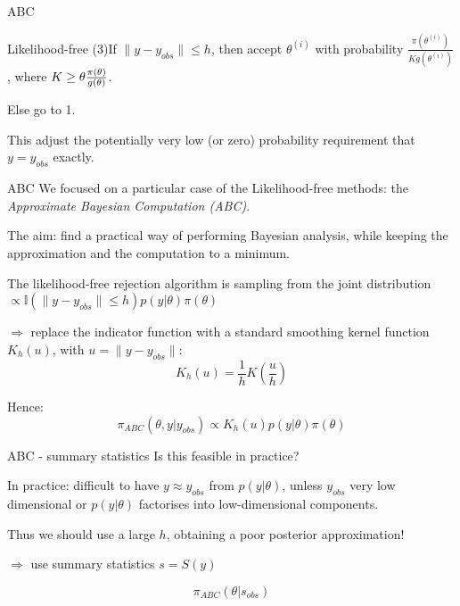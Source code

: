 \documentclass{beamer}
\theoremstyle{plain}
\begin{document}
\begin{section}{ABC}
\begin{frame}{Likelihood-free}
	\vspace{0.3cm}
	(3)If $\parallel y-y_{obs}\parallel \leq h$, then accept $\theta ^ {(i)}$ with probability $\frac{\pi(\theta ^ {(i)})}{K g(\theta ^ {(i)})}$, where $K \geq \maxof{\theta}{\frac{\pi(\theta)}{g(\theta)}}$. 
	
	Else go to 1.
	
	\vspace{0.5cm}
	
	This adjust the potentially very low (or zero) probability requirement that $y = y_{obs}$ exactly.
\end{frame}

\begin{frame}{ABC}
	We focused on a particular case of the Likelihood-free methods: the \emph{Approximate Bayesian Computation (ABC)}.
	
	\vspace{0.5cm}
	
	The aim: find a practical way of performing Bayesian analysis, while keeping the approximation and the computation to a minimum.
	
	\vspace{0.5cm}
	The likelihood-free rejection algorithm is sampling from the joint distribution $\propto \mathbb{I}(\parallel y-y_{obs} \parallel \leq h)p(y|\theta)\pi(\theta)$
	
	
	$\Longrightarrow$ replace the indicator function with a standard smoothing kernel function $K_h(u)$, with $u=\parallel y-y_{obs} \parallel$:
	\[ K_h(u)  =  \frac{1}{h}  K  ( \frac{u}{h} )  \]
	
	
	\vspace{0.2cm}
	Hence:
	\[\pi_{ABC}(\theta, y | y_{obs}) \propto K_h(u)p(y|\theta)\pi(\theta)\]
	
	
\end{frame}

\begin{frame}{ABC - summary statistics}
	Is this feasible in practice?
	
	\vspace{0.5cm}
	In practice: difficult to have $y\approx y_{obs}$ from $p(y|\theta)$, unless $y_{obs}$ very low dimensional or $p(y|\theta)$ factorises into low-dimensional components.
	
	Thus we should use a large $h$, obtaining a poor posterior approximation!
	
	$\Longrightarrow$ use summary statistics $s = S(y)$
	
	\[  \pi_{ABC} (\theta | s_{obs})   \]
\end{frame}


\end{section}
\end{document}
